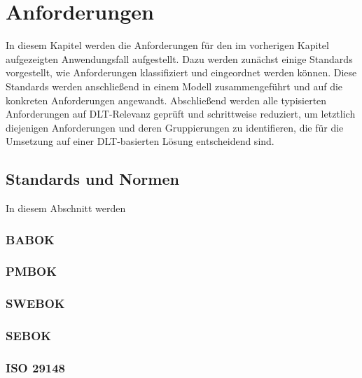\chapter{Anforderungen}
\label{ch:requirements}
In diesem Kapitel werden die Anforderungen für den im vorherigen Kapitel aufgezeigten Anwendungsfall aufgestellt. Dazu werden zunächst einige Standards vorgestellt, wie Anforderungen klassifiziert und eingeordnet werden können. Diese Standards werden anschließend in einem Modell zusammengeführt und auf die konkreten Anforderungen angewandt. Abschließend werden alle typisierten Anforderungen auf \ac{DLT}-Relevanz geprüft und schrittweise reduziert, um letztlich diejenigen Anforderungen und deren Gruppierungen zu identifieren, die für die Umsetzung auf einer \ac{DLT}-basierten Lösung entscheidend sind.

%
%
\section{Standards und Normen}
\label{sec:requirements:standards}
In diesem Abschnitt werden

\subsection{BABOK}
\label{subsec:requirements:standards:BABOK}
\cite{BABOK}

\subsection{PMBOK}
\label{subsec:requirements:standards:PMBOK}
\cite{PMBOK}

\subsection{SWEBOK}
\label{subsec:requirements:standards:SWEBOK}
\cite{SWEBOK}

\subsection{SEBOK}
\label{subsec:requirements:standards:SEBOK}
\cite{SEBOK}

\subsection{ISO 29148}
\label{subsec:requirements:standards:ISO}
\cite{ISO29148}


